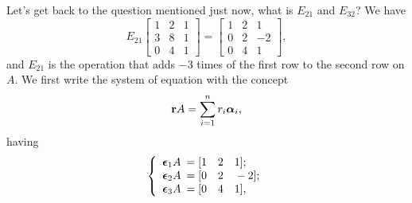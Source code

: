 \documentclass[11pt]{article}
\theoremstyle{break}
\theoremstyle{no_label}
\newcommand{\bfr}{\textbf{r}}
\newcommand{\bfalpha}{\text{\boldmath$\alpha$}}
\newcommand{\bfepsilon}{\text{\boldmath$\epsilon$}}
\numberwithin{equation}{section}
\begin{document}
Let's get back to the question mentioned just now, what is $E_{21}$ and $E_{32}$? We have $$E_{21}\begin{bmatrix}
    1 & 2 & 1 \\
    3 & 8 & 1 \\
    0 & 4 & 1
\end{bmatrix}=\begin{bmatrix}
    1 & 2 & 1 \\
    0 & 2 & -2 \\
    0 & 4 & 1
\end{bmatrix},$$ and $E_{21}$ is the operation that adds $-3$ times of the first row to the second row on $A$. We first write the system of equation with the concept $$\bfr A=\sum_{i=1}^{n}r_i\bfalpha_i,$$ having 
\begin{equation*}
    \left\{\begin{array}{rl}
        \bfepsilon_1 A \!\!\!&= [1\quad 2\quad 1];\\
        \bfepsilon_2 A \!\!\!&= [0\quad 2\quad -2];\\
        \bfepsilon_3 A \!\!\!&= [0\quad 4\quad 1],
    \end{array}\right.
\end{equation*}
\end{document}
